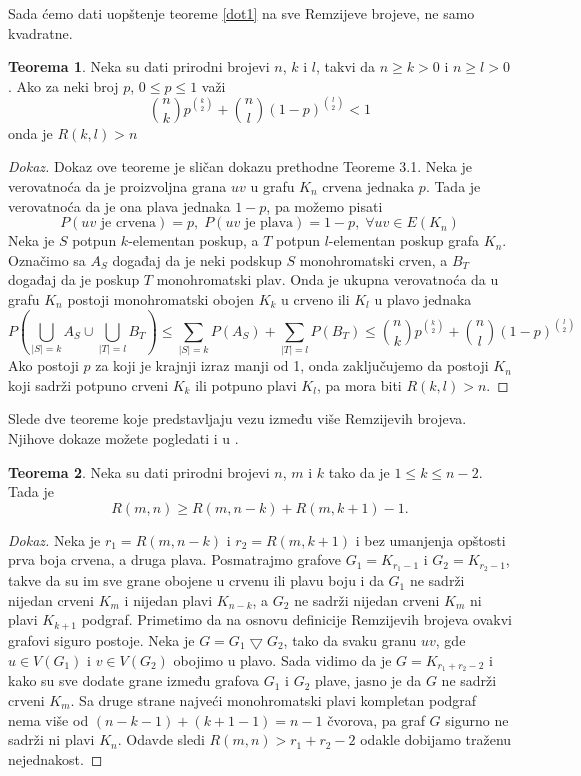 \documentclass{article}
\theoremstyle{definition}
\newtheorem{teorema}{Teorema}[section]
\newcommand{\dokaz}[1]{\begin{proof}[Dokaz]#1\end{proof}}
\begin{document}
	Sada ćemo dati uopštenje teoreme \ref{dot1} na sve Remzijeve brojeve, ne samo kvadratne.
	\begin{teorema}\label{dot2}
		Neka su dati prirodni brojevi $n$, $k$ i $l$, takvi da $n \geq{k} > 0$ i $n \geq{l} > 0$. Ako za neki broj $p$, $0 \leq{p} \leq 1$ važi
		$$\binom{n}{k}p^{\binom{k}{2}} + \binom{n}{l}(1 - p)^{\binom{l}{2}} < 1$$ onda je $R(k,l) > n$
		\dokaz{
			Dokaz ove teoreme je sličan dokazu prethodne Teoreme 3.1. Neka je verovatnoća da je proizvoljna grana $uv$ u grafu $K_n$ crvena jednaka $p$. Tada je verovatnoća da je ona               	plava jednaka $1 - p$, pa možemo pisati 
			$$P(uv \text{ je crvena}) = p,\; P(uv \text{ je plava}) = 1 - p, \; \forall uv \in E(K_n)$$
			Neka je $S$ potpun $k$-elementan poskup, a $T$ potpun $l$-elementan poskup grafa $K_n$. Označimo sa $A_S$ događaj da je neki podskup $S$ monohromatski crven, a $B_T$ događaj  	da je poskup $T$ monohromatski plav. Onda je ukupna verovatnoća da u grafu $K_n$ postoji monohromatski obojen $K_k$ u crveno ili $K_l$ u plavo jednaka
			$$P\left(\bigcup_{|S|=k}A_S \cup \bigcup_{|T|=l}B_T \right) \leq \sum_{|S|=k}P(A_S) + \sum_{|T|=l}P(B_T) \leq \binom{n}{k}p^{\binom{k}{2}} + \binom{n}{l}(1 - p)^{\binom{l}{2}}$$
			Ako postoji $p$ za koji je krajnji izraz manji od 1, onda zaključujemo da postoji $K_n$  koji sadrži potpuno crveni $K_k$ ili potpuno plavi $K_l$, pa mora biti $R(k,l)>n$.
		}
	\end{teorema}
	Slede dve teoreme koje predstavljaju vezu između više Remzijevih brojeva. Njihove dokaze možete pogledati i u \cite{Uzastopni Remzijevi brojevi}.
	\begin{teorema}\label{dot3}
		Neka su dati prirodni brojevi $n$, $m$ i $k$ tako da je $1\leq k \leq n - 2$. Tada je $$R(m,n) \geq R(m, n - k) + R(m, k + 1) - 1.$$ 
		\dokaz{
			Neka je $r_1 = R(m, n - k)$ i $r_2 = R(m, k + 1)$ i bez umanjenja opštosti prva boja crvena, a druga plava. Posmatrajmo grafove 
			$G_1 =K_{r_1 - 1}$ i $G_2 = K_{r_2 - 1}$, takve da su im sve grane obojene u crvenu ili plavu boju i da $G_1$ ne sadrži nijedan crveni $K_m$ i
			nijedan plavi $K_{n - k}$, a $G_2$ ne sadrži nijedan crveni $K_m$ ni plavi $K_{k + 1}$ podgraf. Primetimo da na osnovu definicije Remzijevih
			brojeva ovakvi grafovi siguro postoje. Neka je $G = G_1 \bigtriangledown G_2$, tako da svaku granu $uv$, gde $u \in V(G_1)$ i $v \in V(G_2)$
			obojimo u plavo. Sada vidimo da je $G = K_{r_1 + r_2 - 2}$ i kako su sve dodate grane između grafova $G_1$ i $G_2$ plave, jasno je da $G$ ne
			sadrži crveni $K_m$. Sa druge strane najveći monohromatski plavi kompletan podgraf nema više od $(n - k - 1) + (k + 1 - 1) = n - 1$ čvorova, pa 			graf $G$ sigurno ne sadrži ni plavi $K_n$. Odavde sledi $R(m,n) > r_1 + r_2 - 2$ odakle dobijamo traženu nejednakost. 
		}
	\end{teorema}
\end{document}
